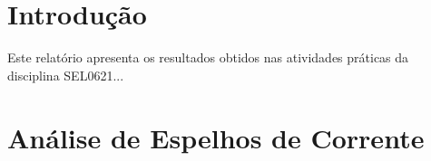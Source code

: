 \section{Introdução}

Este relatório apresenta os resultados obtidos nas atividades práticas da disciplina SEL0621...

\section{Análise de Espelhos de Corrente}

